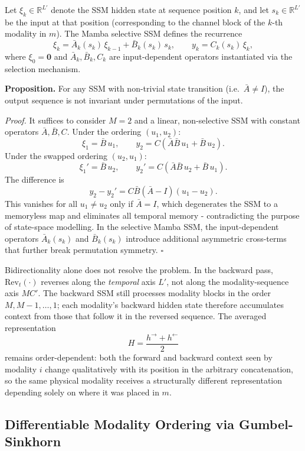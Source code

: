 \documentclass[11pt,a4paper]{article}
\newcommand{\R}{\mathbb{R}}
\begin{document}
	Let $\xi_k \in \R^{L'}$ denote the SSM hidden state at sequence position $k$, and let $s_k \in \R^{L'}$ be the input at that position (corresponding to the channel block of the $k$-th modality in $m$). The Mamba selective SSM \cite{gu2023mamba} defines the recurrence
	$$\xi_k = \bar{A}_k(s_k)\,\xi_{k-1} + \bar{B}_k(s_k)\,s_k, \qquad y_k = C_k(s_k)\,\xi_k,$$
	where $\xi_0 = \mathbf{0}$ and $\bar{A}_k,\bar{B}_k,C_k$ are input-dependent operators instantiated via the selection mechanism.
	
	\textbf{Proposition.} For any SSM with non-trivial state transition (i.e.\ $\bar{A} \neq I$), the output sequence is not invariant under permutations of the input.
	
	\textit{Proof.} It suffices to consider $M = 2$ and a linear, non-selective SSM with constant operators $\bar{A}, \bar{B}, C$. Under the ordering $(u_1, u_2)$:
	$$\xi_1 = \bar{B}\,u_1, \qquad y_2 = C\!\left(\bar{A}\bar{B}\,u_1 + \bar{B}\,u_2\right).$$
	Under the swapped ordering $(u_2, u_1)$:
	$$\xi_1' = \bar{B}\,u_2, \qquad y_2' = C\!\left(\bar{A}\bar{B}\,u_2 + \bar{B}\,u_1\right).$$
	The difference is
	$$y_2 - y_2' = C\bar{B}(\bar{A} - I)(u_1 - u_2).$$
	This vanishes for all $u_1 \neq u_2$ only if $\bar{A} = I$, which degenerates the SSM to a memoryless map and eliminates all temporal memory - contradicting the purpose of state-space modelling. In the selective Mamba SSM, the input-dependent operators $\bar{A}_k(s_k)$ and $\bar{B}_k(s_k)$ introduce additional asymmetric cross-terms that further break permutation symmetry. $\square$
	
	Bidirectionality alone does not resolve the problem. In the backward pass, $\text{Rev}_t(\cdot)$ reverses along the \emph{temporal} axis $L'$, not along the modality-sequence axis $MC'$. The backward SSM still processes modality blocks in the order $M, M{-}1, \dots, 1$; each modality's backward hidden state therefore accumulates context from those that follow it in the reversed sequence. The averaged representation
	$$H = \frac{h^{\rightarrow} + h^{\leftarrow}}{2}$$
	remains order-dependent: both the forward and backward context seen by modality $i$ change qualitatively with its position in the arbitrary concatenation, so the same physical modality receives a structurally different representation depending solely on where it was placed in $m$.
	
	\subsection{Differentiable Modality Ordering via Gumbel-Sinkhorn}
	
\end{document}

